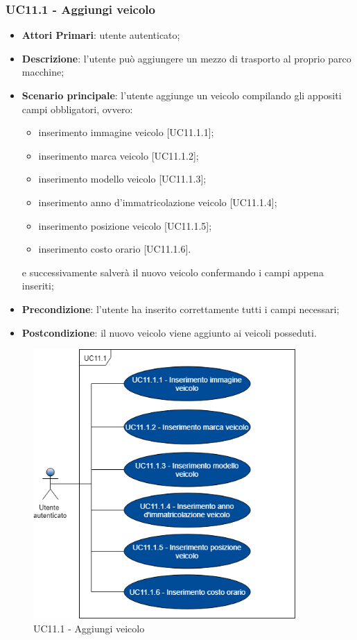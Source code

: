  \subsubsection{UC11.1 - Aggiungi veicolo}
 \begin{itemize}
 	\item \textbf{Attori Primari}: utente autenticato;
 	\item \textbf{Descrizione}: l'utente può aggiungere un mezzo di trasporto al proprio parco macchine;
 	\item \textbf{Scenario principale}: l'utente aggiunge un veicolo compilando gli appositi campi obbligatori, ovvero:
 	\begin{itemize}
 		\item inserimento immagine veicolo [UC11.1.1];
 		\item inserimento marca veicolo [UC11.1.2];
 		\item inserimento modello veicolo [UC11.1.3];
 		\item inserimento anno d'immatricolazione veicolo [UC11.1.4];
 		\item inserimento posizione veicolo [UC11.1.5];
 		\item inserimento costo orario [UC11.1.6].
 	\end{itemize}
 	e successivamente salverà il nuovo veicolo confermando i campi appena inseriti;
 	\item \textbf{Precondizione}: l'utente ha inserito correttamente tutti i campi necessari;
 	\item \textbf{Postcondizione}: il nuovo veicolo viene aggiunto ai veicoli posseduti.
 \end{itemize}
\begin{figure}[H]
	\includegraphics[width=10cm]{res/images/UC10-1Aggiungiveicolo.png}
	\centering
	\caption{UC11.1 - Aggiungi veicolo}
\end{figure}
